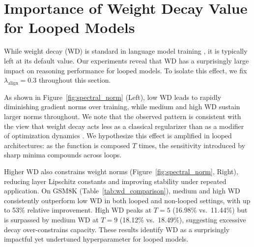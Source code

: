\section{Importance of Weight Decay Value for Looped Models}
\label{sec:appendix:WD}









While weight decay (WD) is standard in language model training
\citep{loshchilov2017decoupled}, it is typically left at its default value.
Our experiments reveal that WD has a surprisingly large impact on reasoning
performance for looped models. To isolate this effect, we fix
$\lambda_\text{align}{=}0.3$ throughout this section.


As shown in Figure~\ref{fig:spectral_norm} (Left), low WD leads to rapidly diminishing gradient norms over training, while medium and high WD sustain larger norms throughout. We note that the observed pattern is consistent with the view that weight decay acts less as a classical regularizer than as a modifier of optimization dynamics \citep{d2024we}. We hypothesize this effect is
amplified in looped architectures: as the function is composed $T$ times,
the sensitivity introduced by sharp minima compounds across loops.



Higher WD also constrains weight norms
(Figure~\ref{fig:spectral_norm}, Right), reducing layer Lipschitz constants
\citep{bartlett2017spectrally} and improving stability under repeated
application. On GSM8K (Table~\ref{tab:wd_comparison}), medium and high WD
consistently outperform low WD in both looped and non-looped settings, with
up to 53\% relative improvement. High WD peaks at $T{=}5$ (16.98\% vs.\
11.44\%) but is surpassed by medium WD at $T{=}9$ (18.12\% vs.\ 18.49\%),
suggesting excessive decay over-constrains capacity. These results identify
WD as a surprisingly impactful yet undertuned hyperparameter for looped
models.




